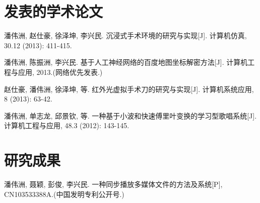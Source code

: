 \begin{resume}

  \section*{发表的学术论文} %

  \begin{enumerate}[{[}1{]}]
  \addtolength{\itemsep}{-.36\baselineskip}%
  \item 潘伟洲, 赵仕豪, 徐泽坤, 李兴民. 沉浸式手术环境的研究与实现[J]. 计算机仿真,
  30.12 (2013): 411-415.
  \item 潘伟洲, 陈振洲, 李兴民. 基于人工神经网络的百度地图坐标解密方法[J].
    计算机工程与应用, 2013.(网络优先发表.)
  \item 赵仕豪, 潘伟洲, 徐泽坤, 等. 红外光虚拟手术刀的研究与实现[J]. 计算机系统应用,
    8 (2013): 63-42.
  \item 潘伟洲, 单志龙, 邱景钦, 等. 一种基于小波和快速傅里叶变换的学习型歌唱系统[J].
    计算机工程与应用, 48.3 (2012): 143-145.
  \end{enumerate}

  \section*{研究成果} %
  \begin{enumerate}[{[}1{]}]
  \addtolength{\itemsep}{-.36\baselineskip}%
  \item 潘伟洲, 聂颖, 彭俊, 李兴民. 一种同步播放多媒体文件的方法及系统[P], CN103533388A.(中国发明专利公开号.)
  \end{enumerate}
\end{resume}
